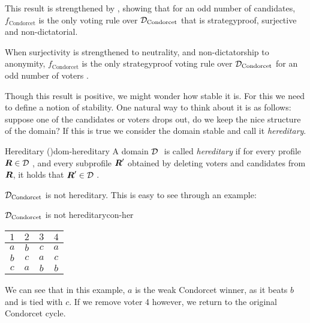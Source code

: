 This result is strengthened by
\citet{campbellNonmonotonicityDoesNot2002,campbellCorrectionStrategyproofnessCharacterization2016},
showing that for an odd number of candidates, \(f_{\text{Condorcet}}\) is the
only voting rule over \(\mathcal{D}_{\textnormal{Condorcet}}\) that is strategyproof, surjective
and non-dictatorial.

When surjectivity is strengthened to neutrality, and non-dictatorship to
anonymity, \linebreak \(f_{\text{Condorcet}}\) is the only strategyproof voting
rule over \(\mathcal{D}_{\textnormal{Condorcet}}\) for an odd number of voters
\cite{campbellAnonymousNeutralStrategyproof2015}.


Though this result is positive, we might wonder how stable it is. For this we
need to define a notion of stability. One natural way to think about it is as
follows: suppose one of the candidates or voters drops out, do we keep the nice
structure of the domain? If this is true we consider the domain stable and call
it \emph{hereditary}.

\begin{definition}{Hereditary \textnormal{(\citet{elkindPreferenceRestrictionsComputational2022})}}{dom-hereditary}
	A domain $\mathcal{D}_{\textnormal{ }}$ is called \emph{hereditary} if for
	every profile $\boldsymbol{R} \in \mathcal{D}_{\textnormal{ }}$, and every subprofile $\boldsymbol{R}'$
	obtained by deleting voters and candidates from $\boldsymbol{R}$, it holds that $\boldsymbol{R}' \in \mathcal{D}_{\textnormal{ }}$.
\end{definition}

$\mathcal{D}_{\textnormal{Condorcet}}$ is not hereditary. This is easy to see through an example:

\begin{example}{$\mathcal{D}_{\textnormal{Condorcet}}$ is not hereditary}{con-her}
	\begin{minipage}{0.25\linewidth}
		\begin{tabular}{cccc}
			\toprule
			$1$ & $2$ & $3$ & $4$ \\
			\midrule
			$a$ & $b$ & $c$ & $a$ \\
			$b$ & $c$ & $a$ & $c$ \\
			$c$ & $a$ & $b$ & $b$ \\
			\bottomrule
		\end{tabular}
	\end{minipage}
	\begin{minipage}[b]{0.70\linewidth}
		We can see that in this example, $a$ is the weak Condorcet
		winner, as it beats $b$ and is tied with $c$. If we
		remove voter 4 however, we return to the original Condorcet cycle.
	\end{minipage}
\end{example}


